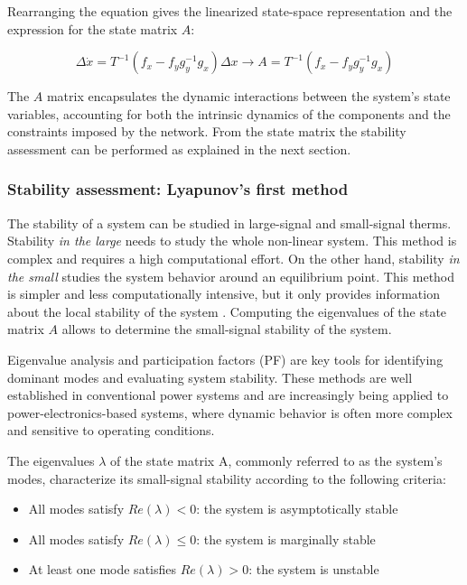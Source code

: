 Rearranging the equation gives the linearized state-space representation and the expression for the state matrix $A$:

\begin{equation}
    \Delta \dot{x} = T^{-1}(f_x-f_yg_y^{-1}g_x) \Delta x  \to A=T^{-1} (f_x-f_yg_y^{-1}g_x) 
\end{equation}


The $A$ matrix encapsulates the dynamic interactions between the system's state variables, accounting for both the intrinsic dynamics of the components and the constraints imposed by the network. 
From the state matrix the stability assessment can be performed as explained in the next section.

\subsubsection{Stability assessment: Lyapunov's first method}

The stability of a system can be studied in large-signal and small-signal therms. Stability \textit{in the large} needs to study the whole non-linear system. This method is complex and requires a high
computational effort. On the other hand, stability \textit{in the small} studies the system behavior around an equilibrium point. This method is simpler and less computationally intensive, but it only 
provides information about the local stability of the system \cite{StabilityAndControlKundur}. Computing the eigenvalues of the state matrix $A$ allows to determine the small-signal stability of the system.

Eigenvalue analysis and participation factors (PF) are key tools for identifying dominant modes and evaluating system stability. These methods are well established in conventional 
power systems and are increasingly being applied to power-electronics-based systems, where dynamic behavior is often more complex and sensitive to operating conditions.

The eigenvalues $\lambda$ of the state matrix A, commonly referred to as the system's modes, characterize its small-signal stability according to the following criteria:

\begin{itemize}
  \item All modes satisfy $Re(\lambda) < 0$: the system is asymptotically stable
  \item All modes satisfy $Re(\lambda) \leq 0$: the system is marginally stable
  \item At least one mode satisfies $Re(\lambda) > 0$: the system is unstable
\end{itemize}


